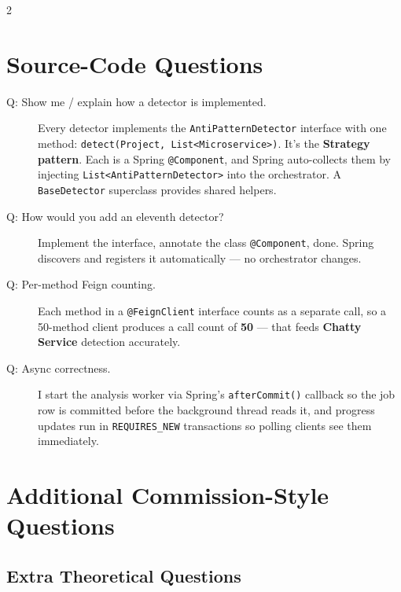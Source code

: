 \documentclass[10pt,a4paper]{article}
\begin{document}
\begin{multicols}{2}
\section{Source-Code Questions}

\begin{description}
    \item[Q: Show me / explain how a detector is implemented.]
    Every detector implements the \texttt{AntiPatternDetector} interface with one method: \texttt{detect(Project, List<Microservice>)}. It's the \textbf{Strategy pattern}. Each is a Spring \texttt{@Component}, and Spring auto-collects them by injecting \texttt{List<AntiPatternDetector>} into the orchestrator. A \texttt{BaseDetector} superclass provides shared helpers.

    \item[Q: How would you add an eleventh detector?]
    Implement the interface, annotate the class \texttt{@Component}, done. Spring discovers and registers it automatically --- no orchestrator changes.


    \item[Q: Per-method Feign counting.]
    Each method in a \texttt{@FeignClient} interface counts as a separate call, so a 50-method client produces a call count of \textbf{50} --- that feeds \textbf{Chatty Service} detection accurately.

    \item[Q: Async correctness.]
    I start the analysis worker via Spring's \texttt{afterCommit()} callback so the job row is committed before the background thread reads it, and progress updates run in \texttt{REQUIRES\_NEW} transactions so polling clients see them immediately.
\end{description}

\section{Additional Commission-Style Questions}

\subsection{Extra Theoretical Questions}


\end{multicols}
\end{document}
